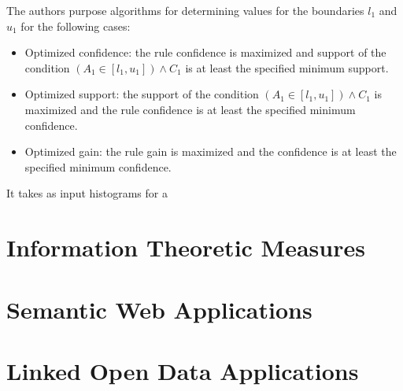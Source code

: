 The authors purpose algorithms for determining values for the boundaries $l_1$ and $u_1$ for the following cases:

\begin{itemize}
 \item Optimized confidence: the rule confidence is maximized and  support of the condition $(A_1 \in [l_1,u_1]) \wedge
C_1$ is at least the specified minimum support.
  \item Optimized support: the support of the condition $(A_1 \in [l_1,u_1]) \wedge C_1$ is maximized and the rule
confidence is at least the specified minimum confidence.
  \item Optimized gain: the rule gain is maximized and the confidence is at least the specified minimum confidence.
\end{itemize}

It takes as input histograms for a 




\section{Information Theoretic Measures}

\cite{DBLP:conf/sac/CaldersGPR09}

\section{Semantic Web Applications}
\section{Linked Open Data Applications}